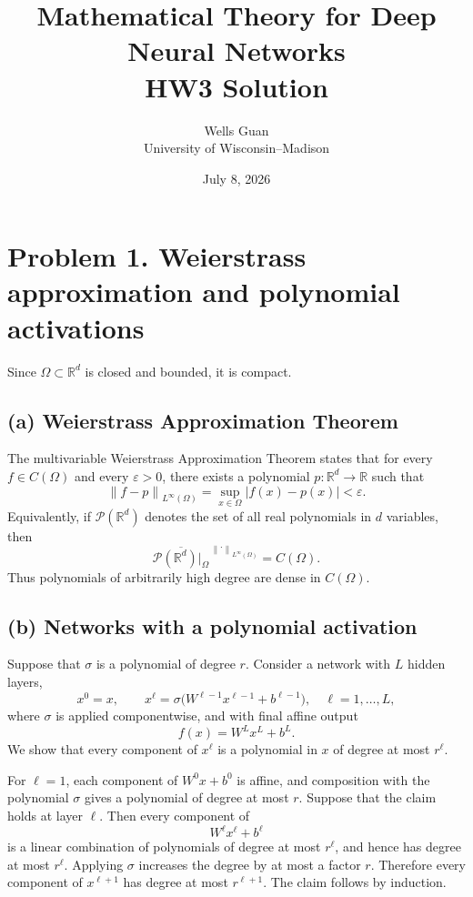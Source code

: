 \documentclass[11pt]{article}
\title{Mathematical Theory for Deep Neural Networks\\HW3 Solution}
\author{Wells Guan\\University of Wisconsin--Madison}
\date{July 8, 2026}
\newcommand{\R}{\mathbb{R}}
\newcommand{\norm}[1]{\left\lVert #1\right\rVert}
\begin{document}
\maketitle

\section*{Problem 1. Weierstrass approximation and polynomial activations}

Since $\Omega\subset\R^d$ is closed and bounded, it is compact.

\subsection*{(a) Weierstrass Approximation Theorem}

The multivariable Weierstrass Approximation Theorem states that for every
$f\in C(\Omega)$ and every $\varepsilon>0$, there exists a polynomial
$p:\R^d\to\R$ such that
\[
  \norm{f-p}_{L^\infty(\Omega)}
  =\sup_{x\in\Omega}|f(x)-p(x)|<\varepsilon.
\]
Equivalently, if $\mathcal P(\R^d)$ denotes the set of all real polynomials in
$d$ variables, then
\[
  \overline{\mathcal P(\R^d)|_\Omega}^{\,\norm{\cdot}_{L^\infty(\Omega)}}
  =C(\Omega).
\]
Thus polynomials of arbitrarily high degree are dense in $C(\Omega)$.

\subsection*{(b) Networks with a polynomial activation}

Suppose that $\sigma$ is a polynomial of degree $r$. Consider a network with
$L$ hidden layers,
\[
  x^0=x,
  \qquad
  x^{\ell}=\sigma\bigl(W^{\ell-1}x^{\ell-1}+b^{\ell-1}\bigr),
  \quad \ell=1,\ldots,L,
\]
where $\sigma$ is applied componentwise, and with final affine output
\[
  f(x)=W^Lx^L+b^L.
\]
We show that every component of $x^\ell$ is a polynomial in $x$ of degree at
most $r^\ell$.

For $\ell=1$, each component of $W^0x+b^0$ is affine, and composition with the
polynomial $\sigma$ gives a polynomial of degree at most $r$. Suppose that the
claim holds at layer $\ell$. Then every component of
\[
  W^\ell x^\ell+b^\ell
\]
is a linear combination of polynomials of degree at most $r^\ell$, and hence
has degree at most $r^\ell$. Applying $\sigma$ increases the degree by at most
a factor $r$. Therefore every component of $x^{\ell+1}$ has degree at most
$r^{\ell+1}$. The claim follows by induction.
\end{document}

